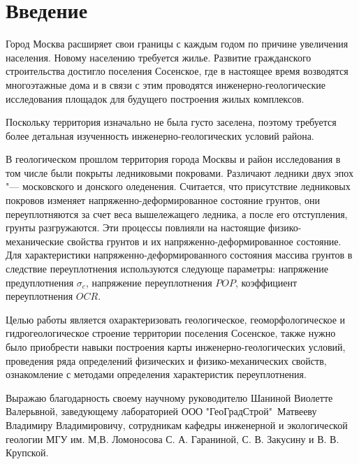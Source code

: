\chapter*{Введение}                         %

Город Москва расширяет свои границы с каждым годом по причине увеличения населения. 
Новому населению требуется жилье. Развитие гражданского строительства достигло поселения 
Сосенское, где в настоящее время возводятся многоэтажные дома и в связи с этим проводятся 
инженерно-геологические исследования площадок для будущего построения жилых 
комплексов. %



Поскольку территория изначально не была густо заселена, поэтому требуется более детальная 
изученность инженерно-геологических условий района.

%
В геологическом прошлом территория города Москвы и район исследования в том числе были 
покрыты ледниковыми покровами. Различают ледники двух эпох "--- московского и донского оледенения. 
Считается, что присутствие ледниковых покровов изменяет напряженно-деформированное состояние 
грунтов, они переуплотняются за счет веса вышележащего ледника, а после его отступления, 
грунты разгружаются. Эти процессы повлияли на настоящие физико-механические свойства грунтов 
и их напряженно-деформированное состояние. Для характеристики напряженно-деформированного 
состояния массива грунтов в следствие переуплотнения используются следующе параметры:
напряжение предуплотнения $\sigma_c$, 
напряжение переуплотнения $POP$,
коэффициент переуплотнения $OCR$.

Целью работы является охарактеризовать геологическое, геоморфологическое и 
гидрогеологическое строение территории поселения Сосенское, также 
нужно было приобрести навыки построения карты инженерно-геологических 
условий, проведения ряда определений физических и физико-механических 
свойств, ознакомление с методами определения характеристик переуплотнения.


Выражаю благодарность своему научному руководителю Шаниной 
Виолетте Валерьвной, заведующему лабораторией ООО "ГеоГрадСтрой"\ 
Матвееву Владимиру Владимировичу, сотрудникам кафедры инженерной 
и экологической геологии МГУ им. М,В. Ломоносова С. А. Гараниной, С. В. Закусину и 
В. В. Крупской.